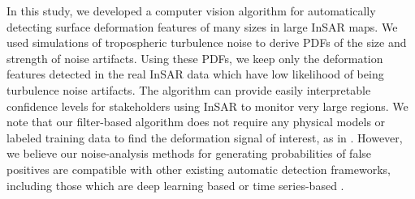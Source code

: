 \documentclass{utexasthesis}
\begin{document}
In this study, we developed a computer vision algorithm for automatically detecting surface deformation features of many sizes in large InSAR maps. We used simulations of tropospheric turbulence noise to derive PDFs of the size and strength of noise artifacts. Using these PDFs, we keep only the deformation features detected in the real InSAR data which have low likelihood of being turbulence noise artifacts. The algorithm can provide easily interpretable confidence levels for stakeholders using InSAR to monitor very large regions. We note that our filter-based algorithm does not require any physical models or labeled training data to find the deformation signal of interest, as in \cite{RouetLeduc2021AutonomousExtractionMillimeter}. However, we believe our noise-analysis methods for generating probabilities of false positives are compatible with other existing automatic detection frameworks, including those which are deep learning based \cite{Anantrasirichai2018ApplicationMachineLearning, Anantrasirichai2019ApplicationConvolutionalNeural, Valade2019TowardsGlobalVolcano} or time series-based \cite{Raspini2018ContinuousSemiAutomatic, Tomas2019SemiAutomaticIdentification}.






%
%
%
%
\end{document}

